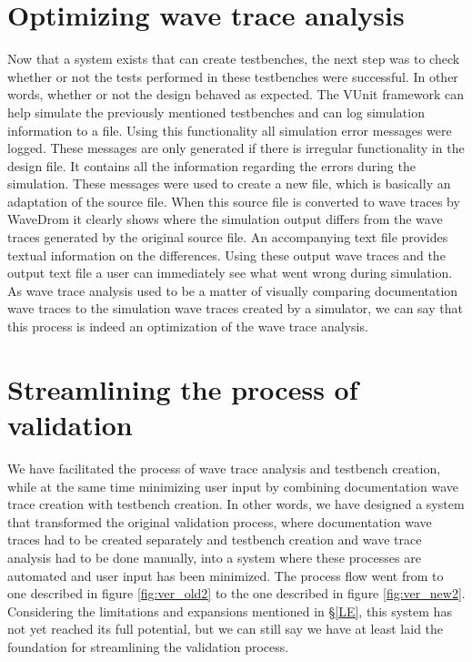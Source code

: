 \section{Optimizing wave trace analysis}
Now that a system exists that can create testbenches, the next step was to check whether or not the tests performed in these testbenches were successful. In other words, whether or not the design behaved as expected.
\npar
The VUnit framework can help simulate the previously mentioned testbenches and can log simulation information to a file. Using this functionality all simulation error messages were logged. These messages are only generated if there is irregular functionality in the design file. It contains all the information regarding the errors during the simulation. These messages were used to create a new file, which is basically an adaptation of the source file. When this source file is converted to wave traces by WaveDrom it clearly shows where the simulation output differs from the wave traces generated by the original source file. An accompanying text file provides textual information on the differences. Using these output wave traces and the output text file a user can immediately see what went wrong during simulation.
\npar
As wave trace analysis used to be a matter of visually comparing documentation wave traces to the simulation wave traces created by a simulator, we can say that this process is indeed an optimization of the wave trace analysis.
\section{Streamlining the process of validation}
We have facilitated the process of wave trace analysis and testbench creation, while at the same time minimizing user input by combining documentation wave trace creation with testbench creation. In other words, we have designed a system that transformed the original validation process, where documentation wave traces had to be created separately and testbench creation and wave trace analysis had to be done manually, into a system where these processes are automated and user input has been minimized. The process flow went from to one described in figure \ref{fig:ver_old2} to the one described in figure \ref{fig:ver_new2}.
\npar
Considering the limitations and expansions mentioned in §\ref{LE}, this system has not yet reached its full potential, but we can still say we have at least laid the foundation for streamlining the validation process.%
%
\npar
{}%
\newpage

